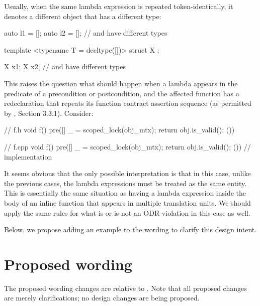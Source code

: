 Usually, when the same lambda expression is repeated token-identically, it denotes a different object that has a different type:
\begin{codeblock}
auto l1 = []{};  
auto l2 = []{};
//  and  have different types

template <typename T = decltype([]{})>
struct X {};

X x1;
X x2;
//  and  have different types
\end{codeblock}
This raises the question what should happen when a lambda appears in the predicate of a precondition or postcondition, and the affected function has a redeclaration that repeats its function contract assertion sequence (as permitted by \cite{P2900R10}, Section 3.3.1). Consider:
\begin{codeblock}
// f.h
void f() pre([]{ _ = scoped_lock(obj_mtx); return obj.is_valid(); }())

// f.cpp  
void f() pre([]{ _ = scoped_lock(obj_mtx); return obj.is_valid(); }()) {
  // implementation
}
\end{codeblock}
It seems obvious that the only possible interpretation is that in this case, unlike the previous cases, the lambda expressions must be treated as the same entity. This is essentially the same situation as having a lambda expression inside the body of an inline function that appears in multiple translation units. We should apply the same rules for what is or is not an ODR-violation in this case as well.

Below, we propose adding an example to the wording to clarify this design intent.

\section{Proposed wording}

The proposed wording changes are relative to \cite{P2900R10}. Note that all proposed changes are merely clarifications; no design changes are being proposed.



